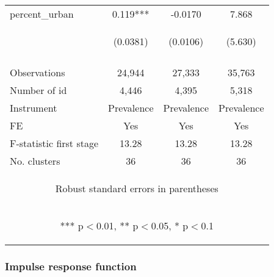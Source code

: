 \documentclass{article}
\begin{document}
\begin{table}[htbp]
{\begin{tabular}{lccc}
percent\_urban & 0.119*** & -0.0170 & 7.868 \\
 & \begin{footnotesize}(0.0381)\end{footnotesize} & \begin{footnotesize}(0.0106)\end{footnotesize} & \begin{footnotesize}(5.630)\end{footnotesize} \\
\vspace{4pt} & \begin{footnotesize}\end{footnotesize} & \begin{footnotesize}\end{footnotesize} & \begin{footnotesize}\end{footnotesize} \\
Observations & 24,944 & 27,333 & 35,763 \\
Number of id & 4,446 & 4,395 & 5,318 \\
Instrument & Prevalence & Prevalence & Prevalence \\
FE & Yes & Yes & Yes \\
F-statistic first stage & 13.28 & 13.28 & 13.28 \\
 No. clusters & 36 & 36 & 36 \\ \hline
\multicolumn{4}{c}{\begin{footnotesize} Robust standard errors in parentheses\end{footnotesize}} \\
\multicolumn{4}{c}{\begin{footnotesize} *** p$<$0.01, ** p$<$0.05, * p$<$0.1\end{footnotesize}} \\
\end{tabular}
}
\end{table}

\subsubsection{Impulse response function}
\end{document}
